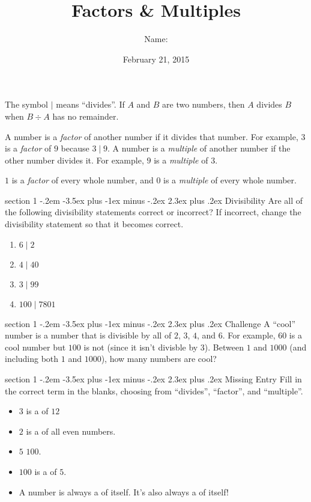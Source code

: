 \documentclass[12pt,letterpaper]{article}
\title{Factors \& Multiples}
\author{Name: \underline{\hspace{5cm}}}
\date{February 21, 2015}
\makeatletter
\newenvironment{problem}{\@startsection
       {section}
       {1}
       {-.2em}
       {-3.5ex plus -1ex minus -.2ex}
       {2.3ex plus .2ex}
       {\pagebreak[3]
       \large\bf\noindent{Problem }
       }
       }
\makeatother
\begin{document}
\maketitle

\thispagestyle{empty}

The symbol $\mid$ means ``divides''. If $A$ and $B$ are
two numbers, then $A$ divides $B$ when $B \div A$ has
no remainder.

A number is a \emph{factor} of another number if it divides
that number. For example, $3$ is a \emph{factor} of $9$
because $3 \mid 9$. A number is a \emph{multiple} of
another number if the other number divides it. For example,
$9$ is a \emph{multiple} of $3$.

$1$ is a \emph{factor} of every whole number, and $0$ is
a \emph{multiple} of every whole number.

\begin{problem}{Divisibility}
 Are all of the following divisibility statements correct or incorrect? If incorrect,
 change the divisibility statement so that it becomes correct.

 \begin{enumerate}
  \item $6 \mid 2$
  \item $4 \mid 40$
  \item $3 \mid 99$
  \item $100 \mid 7801$
 \end{enumerate}

\end{problem}

\begin{problem}{Challenge}
 A ``cool'' number is a number that is divisible by all of $2$, $3$, $4$, and $6$.
 For example, $60$ is a cool number but $100$ is not (since it isn't divisble by $3$).
 Between $1$ and $1000$ (and including both $1$ and $1000$), how many numbers are cool?
\end{problem}

\begin{problem}{Missing Entry}
Fill in the correct term in the blanks, choosing from
``divides'', ``factor'', and ``multiple''.

\begin{itemize}
 \item $3$ is a \underline{\hspace{10em}} of $12$
 \item $2$ is a \underline{\hspace{10em}} of all even
 numbers.
 \item $5$ \underline{\hspace{10em}} $100$.
 \item $100$ is a \underline{\hspace{10em}} of $5$.
 \item A number is always a \underline{\hspace{10em}} of
 itself. It's also always a \underline{\hspace{10em}} of
 itself!
\end{itemize}
\end{problem}
\end{document}
